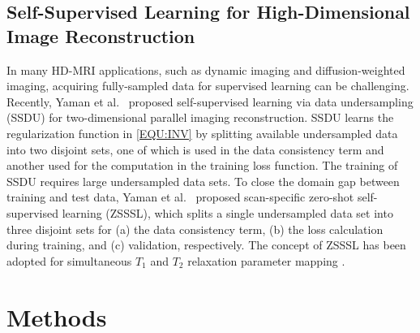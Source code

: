 \documentclass[journal,twoside,web]{ieeecolor}
\begin{document}
	\subsection{Self-Supervised Learning for High-Dimensional Image Reconstruction}

	In many HD-MRI applications, 
	such as dynamic imaging and diffusion-weighted imaging,
	acquiring fully-sampled data
	for supervised learning can be challenging.
	Recently, Yaman et al.~\cite{yaman_2020_ssdu}
	proposed self-supervised learning via data undersampling (SSDU) 
	for two-dimensional parallel imaging reconstruction.
	SSDU learns the regularization function in \cref{EQU:INV}
	by splitting available undersampled data into two disjoint sets,
	one of which is used in the data consistency term and
	another used for the computation in the training loss function.
	The training of SSDU requires large undersampled data sets.
	To close the domain gap between training and test data,
	Yaman et al.~\cite{yaman_2022_zs} proposed
	scan-specific zero-shot self-supervised learning (ZSSSL),
	which splits a single undersampled data set into three disjoint sets
	for (a) the data consistency term, (b) the loss calculation during training,
	and (c) validation, respectively.
	The concept of ZSSSL has been adopted for simultaneous 
	$T_1$ and $T_2$ relaxation parameter mapping
	\cite{heydari_2024_jmaple}.

	\section{Methods}
\end{document}
